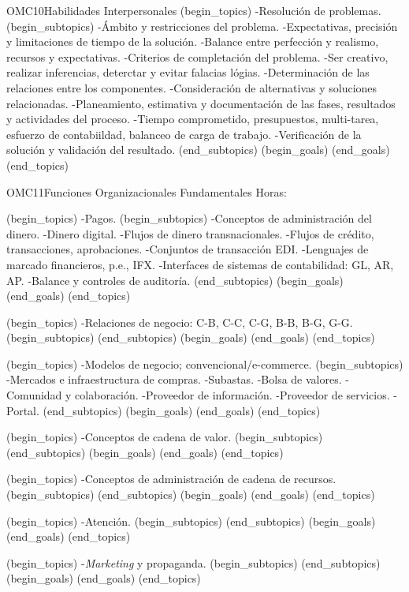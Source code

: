\begin{BKL2}{OMC10}{Habilidades Interpersonales}
(begin_topics)
-Resolución de problemas.
(begin_subtopics)
-Ámbito y restricciones del problema.
-Expectativas, precisión y limitaciones de tiempo de la solución.
-Balance entre perfección y realismo, recursos y expectativas.
-Criterios de completación del problema.
-Ser creativo, realizar inferencias, deterctar y evitar falacias lógias.
-Determinación de las relaciones entre los componentes.
-Consideración de alternativas y soluciones relacionadas.
-Planeamiento, estimativa y documentación de las fases, resultados y actividades del proceso.
-Tiempo comprometido, presupuestos, multi-tarea, esfuerzo de contabiildad, balanceo de carga de trabajo.
-Verificación de la solución y validación del resultado.
(end_subtopics)
(begin_goals)
(end_goals)
(end_topics)
\end{BKL2}

\begin{BKL2}{OMC11}{Funciones Organizacionales Fundamentales}
Horas:
 
(begin_topics)
-Pagos.
(begin_subtopics)
-Conceptos de administración del dinero.
-Dinero digital.
-Flujos de dinero transnacionales.
-Flujos de crédito, transacciones, aprobaciones.
-Conjuntos de transacción EDI.
-Lenguajes de marcado financieros, p.e., IFX.
-Interfaces de sistemas de contabilidad: GL, AR, AP.
-Balance y controles de auditoría.
(end_subtopics)
(begin_goals)
(end_goals)
(end_topics)

 

(begin_topics)
-Relaciones de negocio: C-B, C-C, C-G, B-B, B-G, G-G.
(begin_subtopics)
(end_subtopics)
(begin_goals)
(end_goals)
(end_topics)

 
(begin_topics)
-Modelos de negocio; convencional/e-commerce.
(begin_subtopics)
-Mercados e infraestructura de compras.
-Subastas.
-Bolsa de valores.
-Comunidad y colaboración.
-Proveedor de información.
-Proveedor de servicios.
-Portal.
(end_subtopics)
(begin_goals)
(end_goals)
(end_topics)

 
(begin_topics)
-Conceptos de cadena de valor.
(begin_subtopics)
(end_subtopics)
(begin_goals)
(end_goals)
(end_topics)

 
(begin_topics)
-Conceptos de administración de cadena de recursos.
(begin_subtopics)
(end_subtopics)
(begin_goals)
(end_goals)
(end_topics)

 
(begin_topics)
-Atención.
(begin_subtopics)
(end_subtopics)
(begin_goals)
(end_goals)
(end_topics)

 
(begin_topics)
-\textit{Marketing} y propaganda.
(begin_subtopics)
(end_subtopics)
(begin_goals)
(end_goals)
(end_topics)


\end{BKL2}
